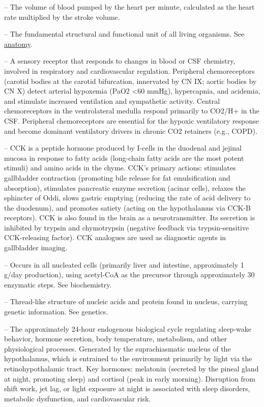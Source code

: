 -- The volume of blood pumped by the heart per minute, calculated as the heart rate multiplied by the stroke volume.

-- The fundamental structural and functional unit of all living organisms. See \hyperlink{Anatomy}{anatomy}.

-- A sensory receptor that responds to changes in blood or CSF chemistry, involved in respiratory and cardiovascular regulation. Peripheral chemoreceptors (carotid bodies at the carotid bifurcation, innervated by CN IX; aortic bodies by CN X) detect arterial hypoxemia (PaO2 <60 mmHg), hypercapnia, and acidemia, and stimulate increased ventilation and sympathetic activity. Central chemoreceptors in the ventrolateral medulla respond primarily to CO2/H+ in the CSF. Peripheral chemoreceptors are essential for the hypoxic ventilatory response and become dominant ventilatory drivers in chronic CO2 retainers (e.g., COPD).

-- CCK is a peptide hormone produced by I-cells in the duodenal and jejinal mucosa in response to fatty acids (long-chain fatty acids are the most potent stimuli) and amino acids in the chyme. CCK's primary actions: stimulates gallbladder contraction (promoting bile release for fat emulsification and absorption), stimulates pancreatic enzyme secretion (acinar cells), relaxes the sphincter of Oddi, slows gastric emptying (reducing the rate of acid delivery to the duodenum), and promotes satiety (acting on the hypothalamus via CCK-B receptors). CCK is also found in the brain as a neurotransmitter. Its secretion is inhibited by trypsin and chymotrypsin (negative feedback via trypsin-sensitive CCK-releasing factor). CCK analogues are used as diagnostic agents in gallbladder imaging.

-- Occurs in all nucleated cells (primarily liver and intestine, approximately 1 g/day production), using acetyl-CoA as the precursor through approximately 30 enzymatic steps. See biochemistry.

-- Thread-like structure of nucleic acids and protein found in nucleus, carrying genetic information. See genetics.

-- The approximately 24-hour endogenous biological cycle regulating sleep-wake behavior, hormone secretion, body temperature, metabolism, and other physiological processes. Generated by the suprachiasmatic nucleus of the hypothalamus, which is entrained to the environment primarily by light via the retinohypothalamic tract. Key hormones: melatonin (secreted by the pineal gland at night, promoting sleep) and cortisol (peak in early morning). Disruption from shift work, jet lag, or light exposure at night is associated with sleep disorders, metabolic dysfunction, and cardiovascular risk.

